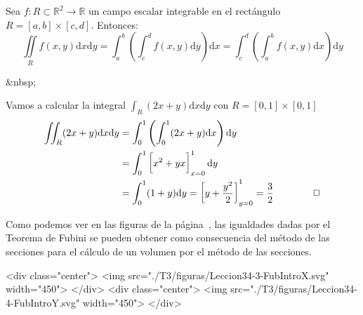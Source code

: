 \begin{teorema}[de Fubini]
Sea $f\colon R\subset\mathbb{R}^2\to \mathbb{R}$ un campo escalar integrable en el rectángulo $R=[a,b]\times[c,d]$.
Entonces:
\[
\iint\limits_R f(x,y)\mathrm dx \mathrm dy
=\int_{a}^{b}\left(\int_{c}^{\mathit d}f(x,y)\mathrm dy\right)\mathrm dx
=\int_{c}^{\mathit d}\left(\int_{a}^{b}f(x,y)\mathrm dx\right)\mathrm dy
\]
\end{teorema}
\begin{rawhtml}
&nbsp;
\end{rawhtml}
\begin{ejemplo}
Vamos a calcular la integral $\displaystyle\int_R(2x+y)\mathrm dx\mathrm dy$ con $R=[0,1]\times[0,1]$
\begin{align*}
\iint_R(2x+y)\mathrm dx\mathrm dy &= \int_0^1\left(\int_0^1 (2x+y)\mathrm dx\right)\mathrm dy \\
&= \int_0^1 \left[x^2+yx\vphantom{\dfrac12}\right]_{x=0}^1\mathrm dy \\
&= \int_0^1 (1+y)\mathrm dy = \left[y+\frac{y^2}{2}\right]_{y=0}^1=\frac32\tag*{\fej}
\end{align*}
\end{ejemplo}

Como podemos ver en las figuras de la página~\pageref{fig:fub-sec}, las igualdades dadas por el Teorema de Fubini se pueden obtener como consecuencia del método de las secciones para el cálculo de un volumen por el método de las secciones.
\begin{rawhtml}
<div class="center">
<img src="./T3/figuras/Leccion34-3-FubIntroX.svg" width="450">
</div>
<div class="center">
<img src="./T3/figuras/Leccion34-4-FubIntroY.svg" width="450">
</div>
\end{rawhtml}



